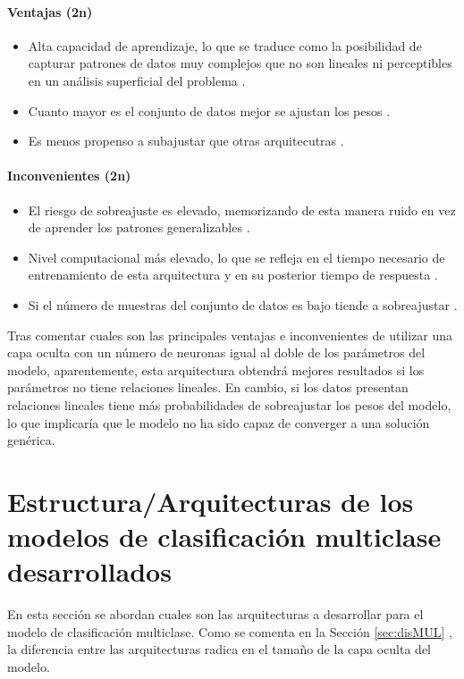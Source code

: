 \paragraph{Ventajas (2n)}
\begin{itemize}
	\item Alta capacidad de aprendizaje, lo que se traduce como la posibilidad de capturar patrones de datos muy complejos que no son lineales ni perceptibles en un análisis superficial del problema \cite{goodfellow2016deep}.
	\item Cuanto mayor es el conjunto de datos mejor se ajustan los pesos \cite{sun2017survey}.
	\item Es menos propenso a subajustar que otras arquitecutras \cite{bishop2006pattern}.
\end{itemize}
\paragraph{Inconvenientes (2n)}
\begin{itemize}
	\item El riesgo de sobreajuste es elevado, memorizando de esta manera ruido en vez de aprender los patrones generalizables \cite{bishop2006pattern}.
	\item Nivel computacional más elevado, lo que se refleja en el tiempo necesario de entrenamiento de esta arquitectura y en su posterior tiempo de respuesta \cite{goodfellow2016deep}.
	\item Si el número de muestras del conjunto de datos es bajo tiende a sobreajustar \cite{overfitting2008}.
\end{itemize}

Tras comentar cuales son las principales ventajas e inconvenientes de utilizar una capa oculta con un número de neuronas igual al doble de los parámetros del modelo, aparentemente, esta arquitectura obtendrá mejores resultados si los parámetros no tiene relaciones lineales. En cambio, si los datos presentan relaciones lineales tiene más probabilidades de sobreajustar los pesos del modelo, lo que implicaría que le modelo no ha sido capaz de converger a una solución genérica.




\section{Estructura/Arquitecturas de los modelos de clasificación multiclase desarrollados}
En esta sección se abordan cuales son las arquitecturas a desarrollar para el modelo de clasificación multiclase. Como se comenta en la Sección \ref{sec:disMUL} , la diferencia entre las arquitecturas radica en el tamaño de la capa oculta del modelo.

